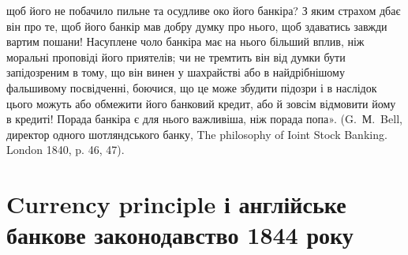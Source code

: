 \parcont{}  %
щоб його не побачило пильне та осудливе око його банкіра? З яким страхом
дбає він про те, щоб його банкір мав добру думку про нього, щоб здаватись
завжди вартим пошани! Насуплене чоло банкіра має на нього більший вплив,
ніж моральні проповіді його приятелів; чи не тремтить він від думки бути запідозреним
в тому, що він винен у шахрайстві або в найдрібнішому фальшивому
посвідченні, боючися, що це може збудити підозри і в наслідок цього можуть
або обмежити його банковий кредит, або й зовсім відмовити йому в кредиті!
Порада банкіра є для нього важливіша, ніж порада попа». (G.~М.~Bell, директор
одного шотляндського банку, The philosophy of Ioint Stock Banking. London 1840,
p. 46, 47).

\section{%
Currency principle і англійське банкове законодавство 1844 року}

